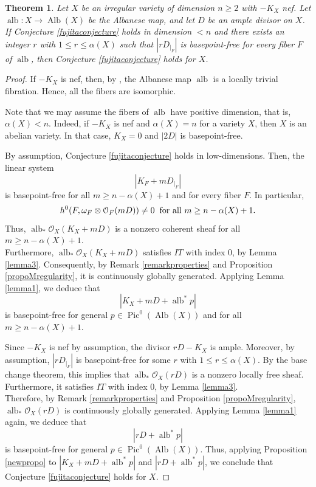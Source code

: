 \documentclass[sn-mathphys-num]{sn-jnl}%
\newtheorem{theorem}{Theorem}[section]
\theoremstyle{definition}
\numberwithin{equation}{section}
\begin{document}
\begin{theorem}
    \label{supplement}
Let $X$ be an irregular variety of dimension $n \geq 2$ with $-K_{X}$ nef. Let $\operatorname{alb}: X \to \operatorname{Alb}(X)$ be the Albanese map, and let $D$ be an ample divisor on $X$. If Conjecture \ref{fujitaconjecture} holds in dimension $<n$ and there exists an integer $r$ with $1\leq r \leq \alpha(X)$ such that $|rD_{|_{F}}|$ is basepoint-free for every fiber $F$ of $\operatorname{alb}$, then Conjecture \ref{fujitaconjecture} holds for $X$.
\end{theorem}
\begin{proof}
    If $-K_{X}$ is nef, then, by \cite[Theorem 1.2]{Cao}, the Albanese map $\operatorname{alb}$ is a  locally trivial fibration. Hence, all the fibers are isomorphic.
\par Note that we may assume the fibers of  $\operatorname{alb}$ have positive dimension, that is, $\alpha(X) < n$. Indeed, if $-K_{X}$ is nef and $\alpha(X) = n$ for a variety $X$, then $X$ is an abelian variety. In that case, $K_{X} =0$ and $|2D|$ is basepoint-free.
\par By assumption, Conjecture \ref{fujitaconjecture} holds in low-dimensions. Then, the linear system $$|K_{F} +mD_{|_{F}}|$$ is basepoint-free for all $m \geq n-\alpha(X)+1$ and for every fiber $F$. In particular,
$$h^{0}(F, \omega_{F} \otimes \mathcal{O}_{F}(mD)) \neq 0 \hspace{0.2cm} \text{for all }  m \geq n-\alpha(X)+1 \text{.}$$
Thus, $\operatorname{alb}_{*}\mathcal{O}_{X}(K_{X} +mD)$ is a nonzero coherent sheaf for all $m \geq n-\alpha(X)+1$. 
\\Furthermore, $\operatorname{alb}_{*}\mathcal{O}_{X}(K_{X} + mD)$ satisfies $IT$ with index $0$, by Lemma \ref{lemma3}. Consequently, by Remark \ref{remarkproperties} and Proposition \ref{propoMregularity}, it is continuously globally generated. Applying Lemma \ref{lemma1}, we deduce that 
 $$|K_{X} + mD + \operatorname{alb}^{*}p|$$ is basepoint-free for general $p \in \operatorname{Pic}^{0}(\operatorname{Alb}(X))$ and for all $m \geq n-\alpha(X)+1$. 
\par Since $-K_{X}$ is nef by assumption, the divisor $rD-K_{X}$ is ample. Moreover, by assumption, $|rD_{|_{F}}|$ is basepoint-free for some $r$ with $1\leq r \leq \alpha(X)$. By the base change theorem, this implies that $\operatorname{alb}_{*}\mathcal{O}_{X}(rD)$ is a nonzero locally free sheaf. Furthermore, it satisfies $IT$ with index $0$, by Lemma \ref{lemma3}. 
\\Therefore, by Remark \ref{remarkproperties} and Proposition \ref{propoMregularity}, $\operatorname{alb}_{*}\mathcal{O}_{X}(rD)$ is continuously globally generated. Applying Lemma \ref{lemma1} again, we deduce that $$|rD + \operatorname{alb}^{*}p|$$ is basepoint-free for general $p \in \operatorname{Pic}^{0}(\operatorname{Alb}(X))$. Thus, applying Proposition \ref{newpropo} to $|K_{X} + mD + \operatorname{alb}^{*}p|$ and $|rD + \operatorname{alb}^{*}p|$, we conclude that Conjecture \ref{fujitaconjecture} holds for $X$.
\end{proof}
\end{document}
